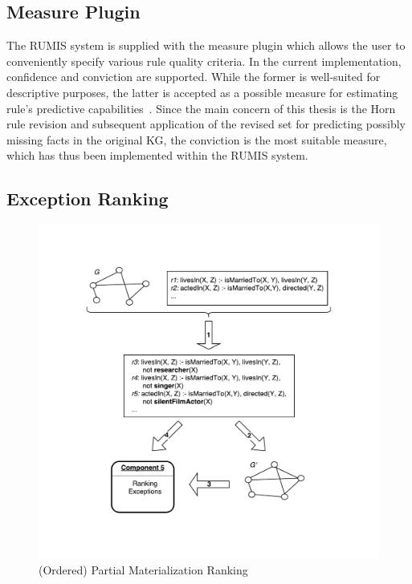 \subsection{Measure Plugin}

The RUMIS system is supplied with the measure plugin which allows the user to conveniently specify various rule quality criteria. In the current implementation, confidence and conviction are supported. While the former is well-suited for descriptive purposes, the latter is accepted as a possible measure for estimating rule's predictive capabilities~\cite{ref46}. Since the main concern of this thesis is the Horn rule revision and subsequent application of the revised set for predicting possibly missing facts in the original KG, the conviction is the most suitable measure, which has thus been implemented within the RUMIS system.

\subsection{Exception Ranking}
\label{intuition_er}

\begin{figure}[t]
\centering
\includegraphics[width=1.0\textwidth]{figures/ranking}
\caption{(Ordered) Partial Materialization Ranking}
\label{pm_ranking}
\end{figure}

